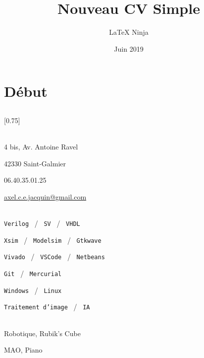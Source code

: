 \documentclass[pastel]{simplehipstercv}
\title{Nouveau CV Simple}
\author{\LaTeX{} Ninja}
\date{Juin 2019}
\begin{document}
\thispagestyle{empty}

\section*{Début}


\subsection*{}
\vspace{4em}

\setlength{\columnsep}{1.5cm}
[0.75]
\begin{paracol}{2}

\paracolbackgroundoptions

\footnotesize
{\setasidefontcolour
\flushright

\begin{center}
\end{center}

 \\[0.5em]

 4 bis, Av. Antoine Ravel

 42330 Saint-Galmier

 06.40.35.01.25 

\protect\url{axel.c.e.jacquin@gmail.com}

\bigskip

\\[0.5em]

\texttt{Verilog} ~/~ \texttt{SV} ~/~ \texttt{VHDL}

\texttt{Xsim} ~/~ \texttt{Modelsim} ~/~ \texttt{Gtkwave}

\texttt{Vivado} ~/~ \texttt{VSCode} ~/~ \texttt{Netbeans}

\texttt{Git} ~/~ \texttt{Mercurial}

\texttt{Windows} ~/~ \texttt{Linux}

\texttt{Traitement d'image} ~/~ \texttt{IA}

\bigskip

\\[0.5em]

Robotique, Rubik’s Cube

MAO, Piano

}
\end{paracol}
\end{document}
